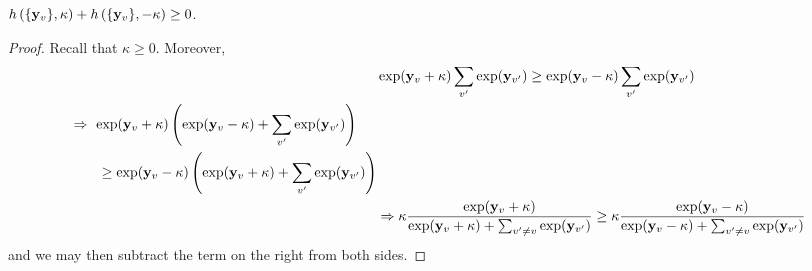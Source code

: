 \documentclass{article}
\begin{document}
\begin{lemma}\label{lemma:hprop1} $h\left( \{\mathbf{y}_v\}, \kappa \right) + h\left( \{\mathbf{y}_v\}, -\kappa \right) \geq 0$.

\begin{proof}
Recall that $\kappa \geq 0$. Moreover,
\begin{align}
    &\exp(\mathbf{y}_v + \kappa) \sum_{v'} \exp(\mathbf{y}_{v'}) \geq \exp(\mathbf{y}_v - \kappa)\sum_{v'}  \exp(\mathbf{y}_{v'}) \\
    \begin{split}
    &\Rightarrow \ \exp(\mathbf{y}_v + \kappa) \left( \exp(\mathbf{y}_v - \kappa) + \sum_{v'} \exp(\mathbf{y}_{v'}) \right)
    \\ &\ \ \ \ \ \ \geq \exp(\mathbf{y}_v - \kappa)\left(  \exp(\mathbf{y}_v + \kappa) + \sum_{v'} \exp(\mathbf{y}_{v'}) \right)
    \end{split} \\
    &\Rightarrow \kappa \frac{\exp(\mathbf{y}_v + \kappa)}{\exp(\mathbf{y}_v + \kappa) + \sum_{v' \neq v}\exp(\mathbf{y}_{v'})} 
    \geq \kappa \frac{\exp(\mathbf{y}_v - \kappa)}{\exp(\mathbf{y}_v - \kappa) + \sum_{v' \neq v}\exp(\mathbf{y}_{v'})}
\end{align}
and we may then subtract the term on the right from both sides.
\end{proof}
\end{lemma}
\end{document}
